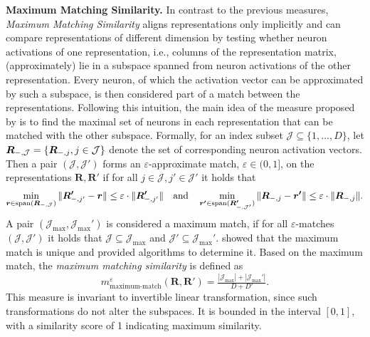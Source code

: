 \documentclass{article}
\newcommand{\citet}{\textcite}
\newcommand{\R}{\bm{R}}
\newcommand{\Rp}{\bm{R'}}
\newcommand{\subheader}{\textbf}
\begin{document}
\subheader{Maximum Matching Similarity.}
In contrast to the previous measures, \emph{Maximum Matching Similarity} \cite{wang_towards_2018} aligns representations only implicitly and can compare representations of different dimension by testing whether neuron activations of one representation, i.e., columns of the representation matrix, (approximately) lie in a subspace spanned from neuron activations of the other representation.
Every neuron, of which the activation vector can be approximated by such a subspace, is then considered part of a match between the representations.
Following this intuition, the main idea of the measure proposed by \citet{wang_towards_2018} is to find the maximal set of neurons in each representation that can be matched with the other subspace.
Formally, for an index subset $\mathcal{J} \subseteq\{1,\dots,D\}$, let $\R_{\--,\mathcal{J}} = \{\R_{\--,j}, j\in\mathcal{J}\}$ denote the set of corresponding neuron activation vectors.
Then a pair $(\mathcal{J}, \mathcal{J}')$ forms an $\varepsilon$-approximate match, $\varepsilon\in(0,1]$, on the representations $\R, \Rp$ if for all $j\in\mathcal{J}, j'\in\mathcal{J}'$ it holds that
\begin{align}
    \min_{\bm{r}\in\operatorname{span} (\R_{\--,\mathcal{J}})}\| \Rp_{-,j'} - \bm{r} \| \leq \varepsilon\cdot \| \Rp_{\--,j'} \| \quad\text{and}\quad \min_{\bm{r'}\in\operatorname{span} (\Rp_{\--,\mathcal{J}'})}\| \R_{\--,j} - \bm{r'} \| \leq \varepsilon\cdot \| \R_{\--,j} \|.
\end{align}
A pair $(\mathcal{J}_{\max}, \mathcal{J}_{\max}')$ is considered a maximum match, if for all $\varepsilon$-matches $(\mathcal{J}, \mathcal{J}')$ it holds that $\mathcal{J}\subseteq\mathcal{J}_{\max}$ and $\mathcal{J}'\subseteq\mathcal{J}_{\max}'$.
\citet{wang_towards_2018} showed that the maximum match is unique and provided algorithms to determine it.
Based on the maximum match, the \emph{maximum matching similarity} is defined as
\begin{equation}
    m_{\operatorname{maximum-match}}^\varepsilon(\R, \Rp) = \tfrac{|\mathcal{J}_{\max}| + |\mathcal{J}_{\max}'|}{D+D'}.
\end{equation}
This measure is invariant to invertible linear transformation, since such transformations do not alter the subspaces.
It is bounded in the interval $[0,1]$, with a similarity score of 1 indicating maximum similarity.
\end{document}
